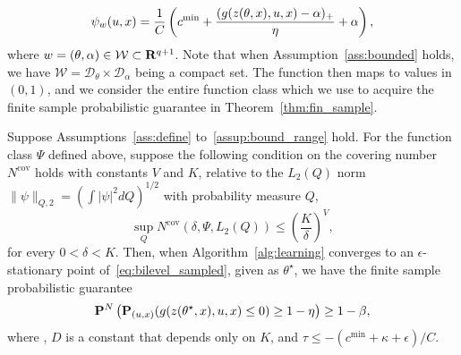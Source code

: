 \begin{equation}
	\label{g_setting}
\psi_{w}(u, x) = \frac{1}{C} \left(c^{\rm min} + \frac{(g(z(\theta,x), u, x) - \alpha)_{+}}{\eta} + \alpha\right),
\end{equation}
where $w = (\theta, \alpha) \in \mathcal{W} \subset {\mathbf R}^{q+1}$.
Note that when Assumption~\ref{ass:bounded} holds, we have $\mathcal{W} = \mathcal{D}_{\theta} \times \mathcal{D}_{\alpha}$ being a compact set.
The function  then maps to values in $(0,1)$, and we consider the entire function class
which we use to acquire the finite sample probabilistic guarantee in Theorem~\ref{thm:fin_sample}.
\begin{theorem}
	\label{thm:fin_sample}
Suppose Assumptions~\ref{ass:define} to~\ref{assup:bound_range} hold.
For the function class $\Psi$ defined above, suppose the following condition on the covering number $N^{\text{cov}}$ holds with constants $V$ and $K$, relative to the $L_2(Q)$ norm~$\|\psi\|_{Q,2} = (\int |\psi|^2 dQ)^{1/2}$ with probability measure $Q$,
\begin{equation}
    \label{eq:covering}
\sup_Q N^{\text{cov}}(\delta,\Psi,L_2(Q)) \leq \left (\frac{K}{\delta}\right )^V,
\end{equation}
for every $0 < \delta < K$. Then, when Algorithm~\ref{alg:learning} converges to an $\epsilon$-stationary point of~\eqref{eq:bilevel_sampled}, given as $\theta^\star$, we have the finite sample probabilistic guarantee
\begin{equation}
	\label{eq:prob_guarantee_fin}
	{\mathbf P}^{N}\left ({\mathbf P}_{(u,x)}(g(z(\theta^\star,x),u,x)\leq 0) \geq 1 - \eta \right) \geq 1 - \beta,
	\end{equation}
	where , $D$ is a constant that depends only on $K$, and $\tau \leq -(c^{\min}+\kappa+\epsilon)/C$. 
\end{theorem}

